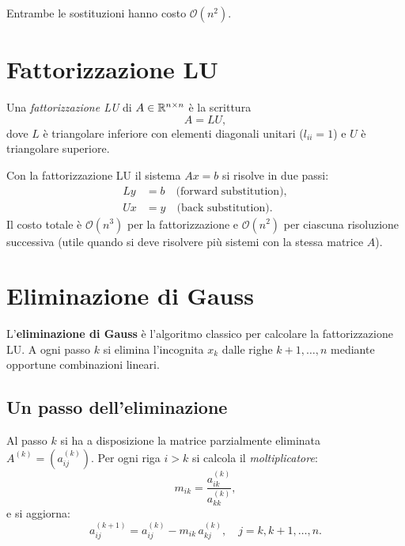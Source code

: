 Entrambe le sostituzioni hanno costo $\mathcal{O}(n^2)$.

\section{Fattorizzazione LU}
\label{sec:lu}

\begin{definition}[Fattorizzazione LU]
Una \emph{fattorizzazione LU} di $A \in \mathbb{R}^{n \times n}$ è la scrittura
\begin{equation}
  A = LU,
  \label{eq:LU}
\end{equation}
dove $L$ è triangolare inferiore con elementi diagonali unitari ($l_{ii} = 1$) e
$U$ è triangolare superiore.
\end{definition}

Con la fattorizzazione LU il sistema $Ax = b$ si risolve in due passi:
\begin{align}
  Ly &= b \quad \text{(forward substitution)}, \label{eq:forw}\\
  Ux &= y \quad \text{(back substitution)}.  \label{eq:back}
\end{align}
Il costo totale è $\mathcal{O}(n^3)$ per la fattorizzazione e $\mathcal{O}(n^2)$ per
ciascuna risoluzione successiva (utile quando si deve risolvere più sistemi con la
stessa matrice $A$).

\section{Eliminazione di Gauss}
\label{sec:gauss}

L'\textbf{eliminazione di Gauss} è l'algoritmo classico per calcolare la
fattorizzazione LU. A ogni passo $k$ si elimina l'incognita $x_k$ dalle righe
$k+1, \ldots, n$ mediante opportune combinazioni lineari.

\subsection{Un passo dell'eliminazione}

Al passo $k$ si ha a disposizione la matrice parzialmente eliminata
$A^{(k)} = (a^{(k)}_{ij})$. Per ogni riga $i > k$ si calcola il
\emph{moltiplicatore}:
\begin{equation}
  m_{ik} = \frac{a^{(k)}_{ik}}{a^{(k)}_{kk}},
  \label{eq:moltiplicatore}
\end{equation}
e si aggiorna:
\begin{equation}
  a^{(k+1)}_{ij} = a^{(k)}_{ij} - m_{ik}\, a^{(k)}_{kj},
  \quad j = k, k+1, \ldots, n.
  \label{eq:update_gauss}
\end{equation}

